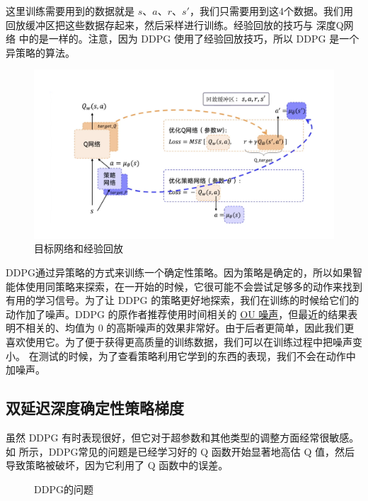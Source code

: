 这里训练需要用到的数据就是 $s$、$a$、$r$、$s'$，我们只需要用到这4个数据。我们用回放缓冲区把这些数据存起来，然后采样进行训练。经验回放的技巧与 深度Q网络 中的是一样的。注意，因为 DDPG 使用了经验回放技巧，所以 DDPG 是一个异策略的算法。

\begin{figure}[hbt]
  \centering
  \includegraphics[width=0.7\linewidth]{res/ch12/12.8}
  \caption{目标网络和经验回放}
  \label{fig:fig12.8}
\end{figure}

DDPG通过异策略的方式来训练一个确定性策略。因为策略是确定的，所以如果智能体使用同策略来探索，在一开始的时候，它很可能不会尝试足够多的动作来找到有用的学习信号。为了让 DDPG 的策略更好地探索，我们在训练的时候给它们的动作加了噪声。DDPG 的原作者推荐使用时间相关的 \href{https://en.wikipedia.org/wiki/Ornstein–Uhlenbeck_process}{OU 噪声}，但最近的结果表明不相关的、均值为 0 的高斯噪声的效果非常好。由于后者更简单，因此我们更喜欢使用它。为了便于获得更高质量的训练数据，我们可以在训练过程中把噪声变小。
在测试的时候，为了查看策略利用它学到的东西的表现，我们不会在动作中加噪声。

\subsection{双延迟深度确定性策略梯度} 

虽然 DDPG 有时表现很好，但它对于超参数和其他类型的调整方面经常很敏感。
如 所示，DDPG常见的问题是已经学习好的 Q 函数开始显著地高估 Q 值，然后导致策略被破坏，因为它利用了 Q 函数中的误差。

\begin{figure}[hbt]
  \centering
  \caption{DDPG的问题}

  \label{fig:fig12.9}
\end{figure}

